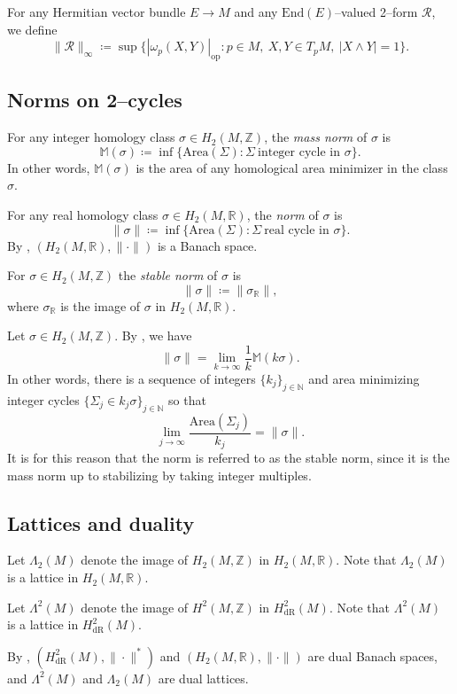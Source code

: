 \documentclass[12pt]{amsart}
\theoremstyle{definition}
\numberwithin{equation}{section}
\newcommand{\R}{\mathbb{R}}
\newcommand{\N}{\mathbb{N}}
\newcommand{\Z}{\mathbb{Z}}
\begin{document}
For any Hermitian vector bundle $E \to M$ and any $\mathrm{End}(E)$--valued 2--form $\mathcal{R}$, we define
\[ \|\mathcal{R}\|_{\infty} \coloneq \sup\{|\omega_p(X,Y)|_{\mathrm{op}} : p\in M, \ X, Y \in T_pM,\ |X \wedge Y| = 1\}. \]


\subsection{Norms on 2--cycles}
For any integer homology class $\sigma \in H_2(M, \Z)$, the \emph{mass norm} of $\sigma$ is
\[ \mathbb{M}(\sigma) \coloneq \inf\{\mathrm{Area}(\Sigma) : \Sigma \ \text{integer\ cycle\ in\ } \sigma\}. \]
In other words, $\mathbb{M}(\sigma)$ is the area of any homological area minimizer in the class $\sigma$.

For any real homology class $\sigma \in H_2(M, \R)$, the \emph{norm} of $\sigma$ is
\[ \|\sigma\| \coloneq \inf\{\mathrm{Area}(\Sigma) : \Sigma \ \text{real\ cycle\ in\ } \sigma\}. \]
By \cite{Federer:norms}, $(H_2(M, \R), \|\cdot\|)$ is a Banach space.

For $\sigma \in H_2(M, \Z)$ the \emph{stable norm} of $\sigma$ is
\[ \|\sigma\| \coloneq \|\sigma_\R\|, \]
where $\sigma_\R$ is the image of $\sigma$ in $H_2(M, \R)$.

Let $\sigma \in H_2(M, \Z)$. By \cite{Federer:norms}, we have
\[ \|\sigma\| = \lim_{k \to \infty} \frac{1}{k}\mathbb{M}(k\sigma). \]
In other words, there is a sequence of integers $\{k_j\}_{j \in \N}$ and area minimizing integer cycles $\{\Sigma_j \in k_j\sigma\}_{j \in \N}$ so that
\[ \lim_{j \to \infty} \frac{\mathrm{Area}(\Sigma_j)}{k_j} = \|\sigma\|. \]
It is for this reason that the norm is referred to as the stable norm, since it is the mass norm up to stabilizing by taking integer multiples.



\subsection{Lattices and duality}
Let $\Lambda_2(M)$ denote the image of $H_2(M, \Z)$ in $H_2(M, \R)$. Note that $\Lambda_2(M)$ is a lattice in $H_2(M,\R)$.

Let $\Lambda^2(M)$ denote the image of $H^2(M, \Z)$ in $H^2_{\mathrm{dR}}(M)$. Note that $\Lambda^2(M)$ is a lattice in $H^2_{\mathrm{dR}}(M)$.

By \cite{Federer:norms}, $(H^2_{\mathrm{dR}}(M), \|\cdot\|^*)$ and $(H_2(M, \R), \|\cdot\|)$ are dual Banach spaces, and $\Lambda^2(M)$ and $\Lambda_2(M)$ are dual lattices.
\end{document}
